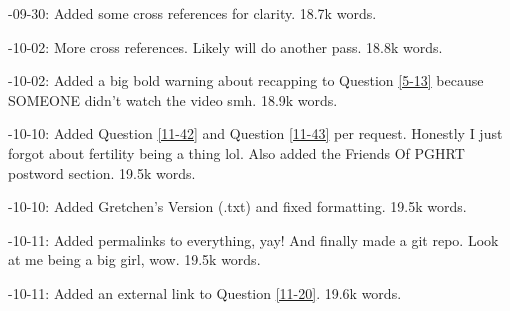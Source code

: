\documentclass{article}
\begin{document}
-09-30: Added some cross references for clarity. 18.7k words.

-10-02: More cross references. Likely will do another pass. 18.8k words.

-10-02: Added a big bold warning about recapping to Question \ref{5-13} because SOMEONE didn't watch the video smh. 18.9k words.

-10-10: Added Question \ref{11-42} and Question \ref{11-43} per request. Honestly I just forgot about fertility being a thing lol. Also added the Friends Of PGHRT postword section. 19.5k words.

-10-10: Added Gretchen's Version (.txt) and fixed formatting. 19.5k words.

-10-11: Added permalinks to everything, yay! And finally made a git repo. Look at me being a big girl, wow. 19.5k words.

-10-11: Added an external link to Question \ref{11-20}. 19.6k words.
\end{document}
